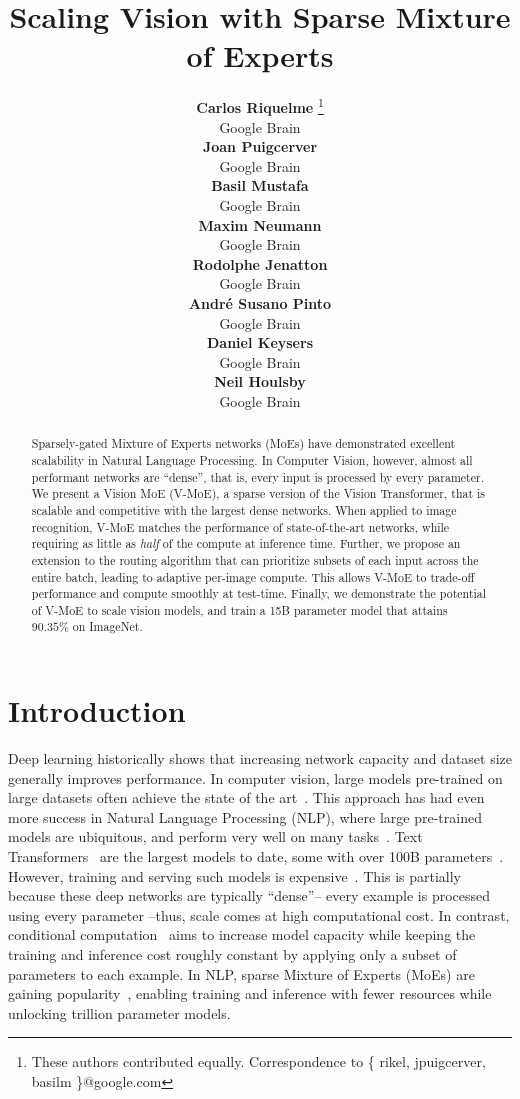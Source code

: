 \documentclass{article}
\title{Scaling Vision with Sparse Mixture of Experts}
\author{ {\bf Carlos Riquelme} \thanks{These authors contributed equally. Correspondence to \{ rikel, jpuigcerver, basilm \}@google.com} \\
Google Brain\\
\And
{\bf Joan Puigcerver} \printfnsymbol{1} \\
Google Brain\\
\And
{\bf Basil Mustafa} \printfnsymbol{1}  \\
Google Brain\\
\And
{\bf Maxim Neumann}   \\
Google Brain\\
\AND
{\bf Rodolphe Jenatton}   \\
Google Brain\\
\And
{\bf Andr\'e Susano Pinto}   \\
Google Brain\\
\And
{\bf Daniel Keysers}   \\
Google Brain\\ 
\And
{\bf Neil Houlsby}   \\
Google Brain\\
}
\newcommand{\name}{Vision MoE}
\newcommand{\abbv}{{V-MoE}}
\begin{document}
\maketitle
\begin{abstract}
Sparsely-gated Mixture of Experts networks (MoEs) have demonstrated excellent scalability in Natural Language Processing.
In Computer Vision, however, almost all performant networks are ``dense'', that is, every input is processed by every parameter.
We present a \name{} (\abbv{}), a sparse version of the Vision Transformer, that is scalable and competitive with the largest dense networks.
When applied to image recognition, \abbv{} matches the performance of state-of-the-art networks, while requiring as little as \emph{half} of the compute at inference time.
Further, we propose an extension to the routing algorithm that can prioritize subsets of each input across the entire batch, leading to adaptive per-image compute.
This allows \abbv{} to trade-off performance and compute smoothly at test-time.
Finally, we demonstrate the potential of \abbv{} to scale vision models, and train a 15B parameter model that attains $90.35\%$ on ImageNet.


\end{abstract}
 \section{Introduction}

Deep learning historically shows that increasing network capacity and dataset size generally improves performance.
In computer vision, large models pre-trained on large datasets often achieve the state of the art~\cite{sun2017revisiting,raffel2019exploring,kolesnikov2019big,dosovitskiy2020image,arnab2021vivit}.
This approach has had even more success in Natural Language Processing (NLP), where large pre-trained models are ubiquitous, and perform very well on many tasks~\cite{peters2018elmo,devlin2019bert}.
Text Transformers~\cite{vaswani2017attention} are the largest models to date, some with over 100B parameters~\cite{brown2020language}.
However, training and serving such models is expensive~\cite{strubell2019energy,patterson2021carbon}.
This is partially because these deep networks are typically ``dense''-- every example is processed using every parameter --thus, scale comes at high computational cost.
In contrast, conditional computation~\cite{bengio2013deep} aims to increase model capacity while keeping the training and inference cost roughly constant by applying only a subset of parameters to each example.
In NLP, sparse Mixture of Experts (MoEs) are gaining popularity~\cite{shazeer2017outrageously,lepikhin2020gshard,fedus2021switch}, enabling training and inference with fewer resources while unlocking trillion parameter models.
\end{document}
